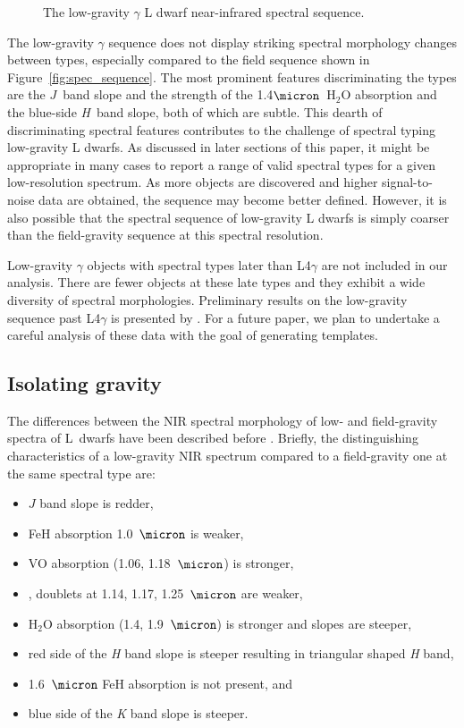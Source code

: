 \documentclass[modern]{aastex61}
\begin{document}

\begin{figure}
  \caption{The low-gravity $\gamma$ L dwarf near-infrared spectral sequence.}
  \label{fig:lg_sequence}
\end{figure}

The low-gravity $\gamma$ sequence does not display striking spectral morphology changes between types, especially compared to the field sequence shown in Figure~\ref{fig:spec_sequence}.
The most prominent features discriminating the types are the $J$~band slope and the strength of the 1.4$\micron$~H$_2$O absorption and the blue-side \emph{H}~band slope, both of which are subtle.
This dearth of discriminating spectral features contributes to the challenge of spectral typing low-gravity L dwarfs.
As discussed in later sections of this paper, it might be appropriate in many cases to report a range of valid spectral types for a given low-resolution spectrum.
As more objects are discovered and higher signal-to-noise data are obtained, the sequence may become better defined.
However, it is also possible that the spectral sequence of low-gravity L dwarfs is simply coarser than the field-gravity sequence at this spectral resolution.

Low-gravity $\gamma$ objects with spectral types later than L4$\gamma$ are not included in our analysis.
There are fewer objects at these late types and they exhibit a wide diversity of spectral morphologies.
Preliminary results on the low-gravity sequence past L4$\gamma$ is presented by \cite{Gagne:2015dc}.
For a future paper, we plan to undertake a careful analysis of these data with the goal of generating templates.

\subsection{Isolating gravity}

The differences between the NIR spectral morphology of low- and field-gravity spectra of L~dwarfs have been described before \citep{Lucas01,McGovern04,Kirkpatrick06,Allers:2013hk}. Briefly, the distinguishing characteristics of a low-gravity NIR spectrum compared to a field-gravity one at the same spectral type are:
\begin{itemize}
\item $J$ band slope is redder,
\item FeH absorption 1.0~$\micron$ is weaker,
\item VO absorption (1.06, 1.18~$\micron$) is stronger,
\item {},  doublets at 1.14, 1.17, 1.25~$\micron$ are weaker,
\item H$_2$O absorption (1.4, 1.9~$\micron$) is stronger and slopes are steeper,
\item red side of the \emph{H} band slope is steeper resulting in triangular shaped \emph{H} band,
\item 1.6~$\micron$ FeH absorption is not present, and
\item blue side of the \emph{K} band slope is steeper.
\end{itemize}
\end{document}
